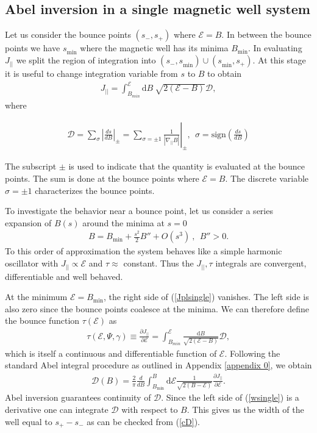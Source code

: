 \documentclass[aip,pop,reprint]{revtex4-1}
\newcommand*\at[2]{\left.#1\right|_{#2}}
\newcommand*{\cD}{\mathcal{D}}
\newcommand*{\cE}{\mathcal{E}}
\newcommand*{\dpl}{\nabla_{||}}
\newcommand*{\Jpl}{J_{||}}
\newcommand*{\dt}{\mathrm{d}}
\newcommand*{\lbr}{\left(}
\newcommand*{\rbr}{\right)}
\newcommand*\smpi[2]{s_{#1}^{#2}}
\newcommand*{\Bmin}{B_{\text{min}}}
\begin{document}
\subsection{Abel inversion in a single magnetic well system}
\label{subsec:abelJplsingle}
 Let us consider the bounce points $\lbr \smpi{-}{}, \smpi{+}{}\rbr$ where $\cE=B$. In between the bounce points we have $\smpi{\text{min}}{}$ where the magnetic well has its minima $B_{\text{min}}$. In evaluating $\Jpl$ we split the region of integration into $\lbr \smpi{-}{},\smpi{\text{min}}{}\rbr \cup \lbr \smpi{\text{min}}{}, \smpi{+}{}\rbr$. At this stage it is useful to change integration variable from $s$ to $B$ to obtain
 \begin{align}
\Jpl = \int_{B_{min}}^{\cE} \dt B\:  \sqrt{2(\cE-B)}\cD ,
\label{Jplsingle}
 \end{align}
where 

\begin{align}
\cD=\sum_\sigma\left|\frac{ds}{dB}\right|_\pm =\sum_{\sigma=\pm 1} \at{\frac{1}{|\dpl B|}}{\pm}
,\:\: \sigma=\text{sign}\lbr\frac{ds}{dB}\rbr
\label{cD}
\end{align} 

The subscript $\pm$ is used to indicate that the quantity is evaluated at the bounce points. The sum is done at the bounce points where $\cE=B$. The discrete variable $\sigma=\pm 1$ characterizes the bounce points.

To investigate the behavior near a bounce point, let us consider a series expansion of $B(s)$ around the minima at $s=0$
\begin{align}
B=\Bmin +\frac{s^2}{2} B'' + O(s^3)\:,\:\: B''>0. \label{Bw}
\end{align}
To this order of approximation the system behaves like a simple harmonic oscillator with $\Jpl \propto \cE$ and $\tau \approx$ constant. Thus the $\Jpl,\tau$ integrals are convergent, differentiable and well behaved. 


At the minimum $\cE=\Bmin$, the right side of (\ref{Jplsingle}) vanishes. The left side is also zero since the bounce points coalesce at the minima. We can therefore define the bounce function $\tau(\cE)$ as
\begin{align}
\tau(\cE,\Psi,\gamma)\equiv\frac{\partial \Jpl}{\partial \cE}=\int_{B_{min}}^\cE \frac{\dt B}{\sqrt{2(\cE-B)}} \cD ,\label{tausingle}
\end{align}
which is itself a continuous and differentiable function of $\cE$. Following the standard Abel integral procedure as outlined in Appendix \ref{appendix 0}, we obtain
 \begin{align}
 \cD(B)= \frac{2}{\pi}\frac{d}{dB} \int_{B_{\text{min}}}^B \dt\cE \frac{1}{\sqrt{2(B-\cE)}} \frac{\partial \Jpl}{\partial \cE} .
 \label{wsingle}
 \end{align}
Abel inversion guarantees continuity of $\cD$. Since the left side of (\ref{wsingle}) is a derivative one can integrate $\cD$ with respect to $B$. This gives us the width of the well equal to $\smpi{+}{}-\smpi{-}{}$ as can be checked from (\ref{cD}).
\end{document}
